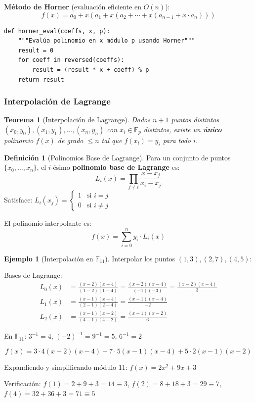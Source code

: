 \documentclass[11pt,a4paper,twoside,openright]{book}
\theoremstyle{definition}
\newtheorem{definition}{Definición}[chapter]
\newtheorem{example}{Ejemplo}[chapter]
\theoremstyle{plain}
\newtheorem{theorem}{Teorema}[chapter]
\theoremstyle{remark}
\begin{document}
\textbf{Método de Horner} (evaluación eficiente en $O(n)$):
\[ f(x) = a_0 + x(a_1 + x(a_2 + \cdots + x(a_{n-1} + x \cdot a_n))) \]

\begin{verbatim}
def horner_eval(coeffs, x, p):
    """Evalúa polinomio en x módulo p usando Horner"""
    result = 0
    for coeff in reversed(coeffs):
        result = (result * x + coeff) % p
    return result
\end{verbatim}

\subsubsection{Interpolación de Lagrange}

\begin{theorem}[Interpolación de Lagrange]
Dados $n+1$ puntos distintos $(x_0, y_0), (x_1, y_1), \ldots, (x_n, y_n)$ con $x_i \in \mathbb{F}_p$ distintos, existe un \textbf{único} polinomio $f(x)$ de grado $\leq n$ tal que $f(x_i) = y_i$ para todo $i$.
\end{theorem}

\begin{definition}[Polinomios Base de Lagrange]
Para un conjunto de puntos $\{x_0, \ldots, x_n\}$, el $i$-ésimo \textbf{polinomio base de Lagrange} es:
\[ L_i(x) = \prod_{j \neq i} \frac{x - x_j}{x_i - x_j} \]
Satisface: $L_i(x_j) = \begin{cases} 1 & \text{si } i = j \\ 0 & \text{si } i \neq j \end{cases}$
\end{definition}

El polinomio interpolante es:
\[ f(x) = \sum_{i=0}^{n} y_i \cdot L_i(x) \]

\begin{example}[Interpolación en $\mathbb{F}_{11}$]
Interpolar los puntos $(1, 3), (2, 7), (4, 5)$:

Bases de Lagrange:
\begin{align*}
    L_0(x) &= \frac{(x-2)(x-4)}{(1-2)(1-4)} = \frac{(x-2)(x-4)}{(-1)(-3)} = \frac{(x-2)(x-4)}{3} \\
    L_1(x) &= \frac{(x-1)(x-4)}{(2-1)(2-4)} = \frac{(x-1)(x-4)}{-2} \\
    L_2(x) &= \frac{(x-1)(x-2)}{(4-1)(4-2)} = \frac{(x-1)(x-2)}{6}
\end{align*}

En $\mathbb{F}_{11}$: $3^{-1} = 4$, $(-2)^{-1} = 9^{-1} = 5$, $6^{-1} = 2$

\[ f(x) = 3 \cdot 4(x-2)(x-4) + 7 \cdot 5(x-1)(x-4) + 5 \cdot 2(x-1)(x-2) \]

Expandiendo y simplificando módulo 11: $f(x) = 2x^2 + 9x + 3$

Verificación: $f(1) = 2 + 9 + 3 = 14 \equiv 3$, $f(2) = 8 + 18 + 3 = 29 \equiv 7$, $f(4) = 32 + 36 + 3 = 71 \equiv 5$ \checkmark
\end{example}
\end{document}

